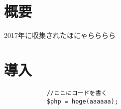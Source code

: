\documentclass[../main]{subfiles}
\begin{document}
    \section*{概要}
        2017年に収集されたほにゃらららら

    \section{導入}
        \begin{lstlisting}
            //ここにコードを書く
            $php = hoge(aaaaaa);
        \end{lstlisting}
\end{document}
